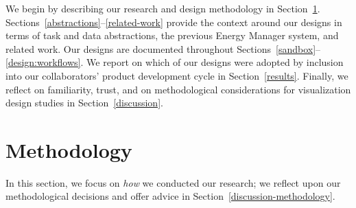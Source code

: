 \documentclass[journal]{vgtc}                %
\newcommand{\bstart}[1]{\vspace{1mm} \noindent{\textbf{#1:}}}
\begin{document}
\bstart{Outline} We begin by describing our research and design methodology in Section~\ref{methodology}.
Sections~\ref{abstractions}--\ref{related-work} provide the context around our designs in terms of task and data abstractions, the previous Energy Manager system, and related work. 
Our designs are documented throughout Sections~\ref{sandbox}--\ref{design:workflows}. 
We report on which of our designs were adopted by inclusion into our collaborators' product development cycle in Section~\ref{results}.
Finally, we reflect on familiarity, trust, and on methodological considerations for visualization design studies in Section~\ref{discussion}.


\section{Methodology}
\label{methodology}


In this section, we focus on {\it how} we conducted our research; we reflect upon our methodological decisions and offer advice in Section~\ref{discussion-methodology}. 
\end{document}
